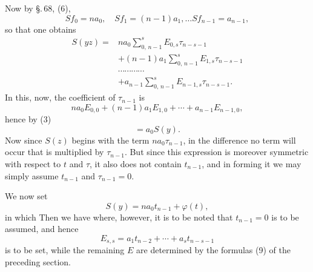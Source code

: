 Now by \S.\,68, (6),
\[
S f_0 = n a_0, \quad S f_1 = (n-1) a_1, \ldots S f_{n-1} = a_{n-1},
\]
so that one obtains
\[
\begin{aligned}
S(y z) = {} & n a_0 \sum_{0,\,n-1}^{s} E_{0,s} \tau_{n-s-1} \\
& + (n-1) a_1 \sum_{0,\,n-1}^{s} E_{1,s} \tau_{n-s-1} \\
& \cdots\cdots\cdots\cdots \\
& + a_{n-1} \sum_{0,\,n-1}^{s} E_{n-1,s} \tau_{n-s-1}.
\end{aligned}
\]
In this, now, the coefficient of $\tau_{n-1}$ is
\[
n a_0 E_{0,0} + (n-1) a_1 E_{1,0} + \cdots + a_{n-1} E_{n-1,0},
\]
hence by (3)
\[
= a_0 S(y).
\]
Now since $S(z)$ begins with the term $n a_0 \tau_{n-1}$, in the
difference
no term will occur that is multiplied by $\tau_{n-1}$. But since this
expression is moreover symmetric with respect to $t$ and $\tau$,
it also does not contain $t_{n-1}$, and in forming it we may
simply assume $t_{n-1}$ and $\tau_{n-1} = 0$.

We now set
\[
S(y) = n a_0 t_{n-1} + \varphi(t),
\]
in which
Then we have
where, however, it is to be noted that $t_{n-1} = 0$ is to be assumed, and hence
\[
E_{s,s} = a_1 t_{n-2} + \cdots + a_s t_{n-s-1}
\]
is to be set, while the remaining $E$ are determined by the formulas (9) of the
preceding section.
